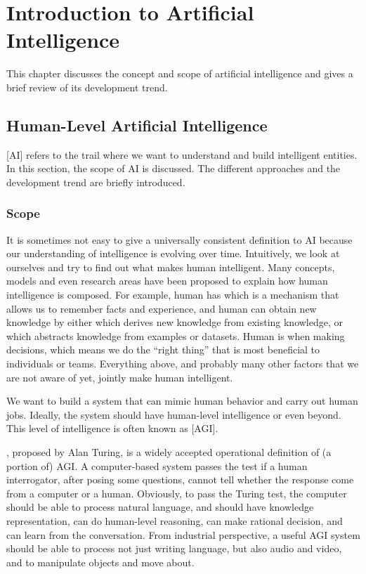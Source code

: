 \chapter{Introduction to Artificial Intelligence}

This chapter discusses the concept and scope of artificial intelligence and gives a brief review of its development trend.

\section{Human-Level Artificial Intelligence}

[AI] refers to the trail where we want to understand and build intelligent entities. In this section, the scope of AI is discussed. The different approaches and the development trend are briefly introduced.

\subsection{Scope}

It is sometimes not easy to give a universally consistent definition to AI because our understanding of intelligence is evolving over time. Intuitively, we look at ourselves and try to find out what makes human intelligent. Many concepts, models and even research areas have been proposed to explain how human intelligence is composed. For example, human has  which is a mechanism that allows us to remember facts and experience, and human can obtain new knowledge by either  which derives new knowledge from existing knowledge, or  which abstracts knowledge from examples or datasets. Human is  when making decisions, which means we do the ``right thing'' that is most beneficial to individuals or teams. Everything above, and probably many other factors that we are not aware of yet, jointly make human intelligent.

We want to build a system that can mimic human behavior and carry out human jobs. Ideally, the system should have human-level intelligence or even beyond. This level of intelligence is often known as [AGI]. 

, proposed by Alan Turing, is a widely accepted operational definition of (a portion of) AGI. A computer-based system passes the test if a human interrogator, after posing some questions, cannot tell whether the response come from a computer or a human. Obviously, to pass the Turing test, the computer should be able to process natural language, and should have knowledge representation, can do human-level reasoning, can make rational decision, and can learn from the conversation. From industrial perspective, a useful AGI system should be able to process not just writing language, but also audio and video, and to manipulate objects and move about.

